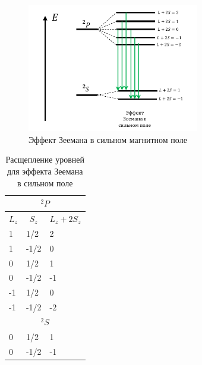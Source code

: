 \documentclass[12pt]{article}
\begin{document}
\begin{figure}[h!]
    \centering
    \includegraphics[width=0.67\textwidth,height=\textheight,keepaspectratio]{Seminar_08/pics/pic_04.pdf}
    \caption{Эффект Зеемана в сильном магнитном поле}
    \label{fig:sem_08_strong_zeeman}
\end{figure}


\begin{table}[h!]
\centering
\begin{tabular}{|l|l|l|}
\hline
\multicolumn{3}{|c|}{${}^2P$}                                                                 \\ \hline
\multicolumn{1}{|c|}{$L_z$} & \multicolumn{1}{c|}{$S_z$} & \multicolumn{1}{c|}{$L_z+2S_z$} \\ \hline
1                          & 1/2                       & 2                               \\ \hline
1                          & -1/2                      & 0                               \\ \hline
0                          & 1/2                       & 1                               \\ \hline
0                          & -1/2                      & -1                              \\ \hline
-1                         & 1/2                       & 0                               \\ \hline
-1                         & -1/2                      & -2                              \\ \hline
\multicolumn{3}{|c|}{${}^2S$}                                                                 \\ \hline
0                          & 1/2                       & 1                               \\ \hline
0                          & -1/2                      & -1                              \\ \hline
\end{tabular}
\caption{Расщепление уровней для эффекта Зеемана в сильном поле}
\end{table}
\end{document}
